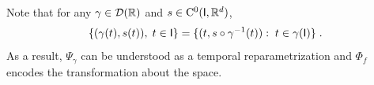 
        

    \begin{remark}
      Note that for any $\gamma \in \mathcal{D}(\mathbb{R}) $ and $s\in \mathrm{C}^0(\mathsf{I},\mathbb{R}^d)$,
   \begin{equation}
    \{(\gamma(t),s(t)),\; t\in \mathsf{I} \}=\{(t,s\circ \gamma^{-1}(t)):\; t\in\gamma(\mathsf{I}) \}\; .
   \end{equation}
   As a result, $\Psi_\gamma $ can be understood as a temporal reparametrization and $\Phi_f$ encodes the transformation about the space.
 \end{remark}

 \vspace{-1ex}
